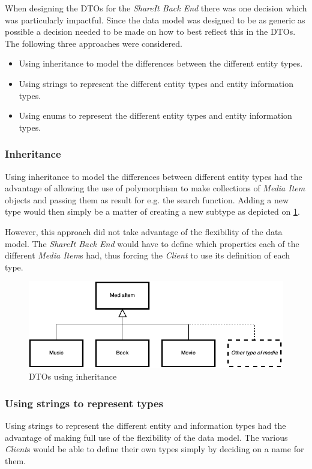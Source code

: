 \documentclass[../report.tex]{subfiles}
\begin{document}
\graphicspath{{img/}{../img/}}
\label{sec:enums}

When designing the DTOs for the \textit{ShareIt Back End} there was one decision which was particularly impactful.
Since the data model was designed to be as generic as possible a decision needed to be made on how to best reflect this in the DTOs.
The following three approaches were considered.
\begin{itemize}
\item Using inheritance to model the differences between the different entity types.
\item Using strings to represent the different entity types and entity information types.
\item Using enums to represent the different entity types and entity information types.
\end{itemize}

\subsubsection{Inheritance}
Using inheritance to model the differences between different entity types had the advantage of allowing the use of polymorphism to make collections of \textit{Media Item} objects and passing them as result for e.g. the search function. Adding a new type would then simply be a matter of creating a new subtype as depicted on \ref{fig:dto_inheritance}.
 
However, this approach did not take advantage of the flexibility of the data model. The \textit{ShareIt Back End} would have to define which properties each of the different \textit{Media Item}s had, thus forcing the \textit{Client} to use its definition of each type.

\begin{figure}[!h]
\label{fig:dto_inheritance}
\centering
\includegraphics[scale=0.7]{DTOInheritance.pdf}
\caption{DTOs using inheritance}
\end{figure}

\subsubsection{Using strings to represent types}
Using strings to represent the different entity and information types had the advantage of making full use of the flexibility of the data model. The various \textit{Client}s would be able to define their own types simply by deciding on a name for them. 
\end{document}
